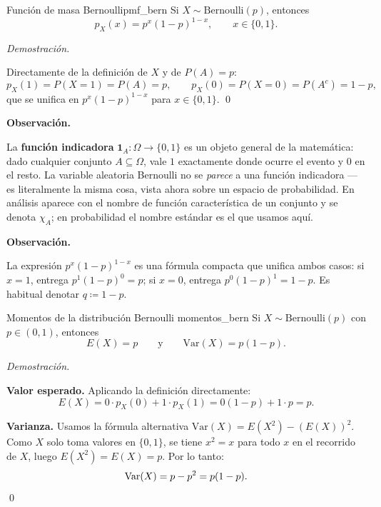 \documentclass[12pt, a4paper]{book}
\newenvironment{observacion}{%
    \par\medskip\noindent\textbf{\color{azul}Observaci\'{o}n.}\enspace\itshape
}{\par\medskip}
\renewenvironment{proof}{%
    \par\medskip\noindent\textit{Demostraci\'{o}n.}\enspace
}{\qed\par\medskip}
\numberwithin{equation}{chapter}
\begin{document}
\begin{proposicion}{Funci\'{o}n de masa Bernoulli}{pmf_bern}
	Si $X \sim \mathrm{Bernoulli}(p)$, entonces
	\[
	p_X(x) = p^x(1-p)^{1-x}, \qquad x \in \{0,1\}.
	\]
\end{proposicion}

\begin{proof}
	Directamente de la definición de $X$ y de $P(A) = p$:
	\[
	p_X(1) = P(X=1) = P(A) = p,
	\qquad
	p_X(0) = P(X=0) = P(A^c) = 1-p,
	\]
	que se unifica en $p^x(1-p)^{1-x}$ para $x \in \{0,1\}$. \qedhere
\end{proof}

\begin{observacion}
	La \textbf{función indicadora} $\mathbf{1}_A : \Omega \to \{0,1\}$
	es un objeto general de la matemática: dado cualquier conjunto
	$A \subseteq \Omega$, vale $1$ exactamente donde ocurre el evento y
	$0$ en el resto. La variable aleatoria Bernoulli no se \emph{parece}
	a una función indicadora --- es literalmente la misma cosa, vista
	ahora sobre un espacio de probabilidad. En análisis aparece con el
	nombre de función característica de un conjunto y se denota
	$\chi_A$; en probabilidad el nombre estándar es el que usamos aquí.
\end{observacion}

\begin{observacion}
	La expresión $p^x(1-p)^{1-x}$ es una fórmula compacta que unifica
	ambos casos: si $x=1$, entrega $p^1(1-p)^0 = p$; si $x=0$, entrega
	$p^0(1-p)^1 = 1-p$. Es habitual denotar $q \coloneqq 1-p$.
\end{observacion}

\begin{proposicion}{Momentos de la distribuci\'{o}n Bernoulli}
	{momentos_bern}
	Si $X \sim \mathrm{Bernoulli}(p)$ con $p \in (0,1)$, entonces
	\[
	E(X) = p \qquad \text{y} \qquad \mathrm{Var}(X) = p(1-p).
	\]
\end{proposicion}

\begin{proof}
	\textbf{Valor esperado.} Aplicando la definición directamente:
	\[
	E(X) = 0\cdot p_X(0) + 1\cdot p_X(1) = 0(1-p) + 1\cdot p = p.
	\]
	
	\textbf{Varianza.} Usamos la fórmula alternativa
	$\mathrm{Var}(X) = E(X^2) - (E(X))^2$. Como $X$ solo toma valores
	en $\{0,1\}$, se tiene $x^2 = x$ para todo $x$ en el recorrido de
	$X$, luego $E(X^2) = E(X) = p$. Por lo tanto:
	\[
	\mathrm{Var}(X) = p - p^2 = p(1-p). \qedhere
	\]
\end{proof}
\end{document}
